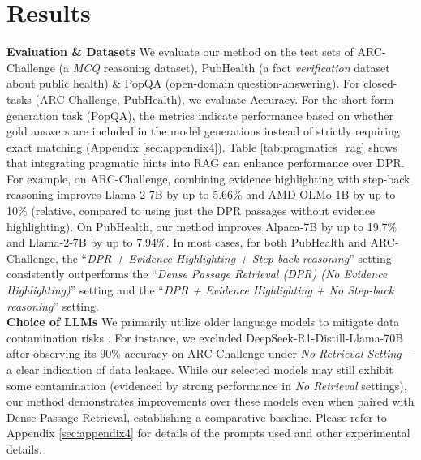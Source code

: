 \section{Results}
\label{sec:results}
\textbf{Evaluation \& Datasets} We evaluate our method on the test sets of ARC-Challenge (a \textit{MCQ} reasoning dataset), PubHealth (a fact \textit{verification} dataset about public health) \& PopQA (open-domain question-answering). For closed-tasks (ARC-Challenge, PubHealth), we evaluate Accuracy. For the short-form generation task (PopQA), the metrics indicate performance based on whether gold answers are included in the model generations instead of strictly requiring exact matching (Appendix \ref{sec:appendix4}). Table \ref{tab:pragmatics_rag} shows that integrating pragmatic hints into RAG can enhance performance over DPR. For example, on ARC-Challenge, combining evidence highlighting with step-back reasoning improves Llama-2-7B by up to 5.66\% and AMD-OLMo-1B by up to 10\% (relative, compared to using just the DPR passages without evidence highlighting). On PubHealth, our method improves Alpaca-7B by up to 19.7\% and Llama-2-7B by up to 7.94\%. In most cases, for both PubHealth and ARC-Challenge, the ``\textit{DPR + Evidence Highlighting + Step-back reasoning}'' setting consistently outperforms the ``\textit{Dense Passage Retrieval (DPR) (No Evidence Highlighting)}'' setting and the ``\textit{DPR + Evidence Highlighting + No Step-back reasoning}'' setting.\\
\textbf{Choice of LLMs} We primarily utilize older language models to mitigate data contamination risks \cite{sainz-etal-2023-nlp}. For instance, we excluded DeepSeek-R1-Distill-Llama-70B \cite{deepseekai2025deepseekr1incentivizingreasoningcapability} after observing its 90\% accuracy on ARC-Challenge under \textit{No Retrieval Setting}---a clear indication of data leakage. While our selected models may still exhibit some contamination (evidenced by strong performance in \textit{No Retrieval} settings), our method demonstrates improvements over these models even when paired with Dense Passage Retrieval, establishing a comparative baseline. Please refer to Appendix \ref{sec:appendix4} for details of the prompts used and other experimental details.
